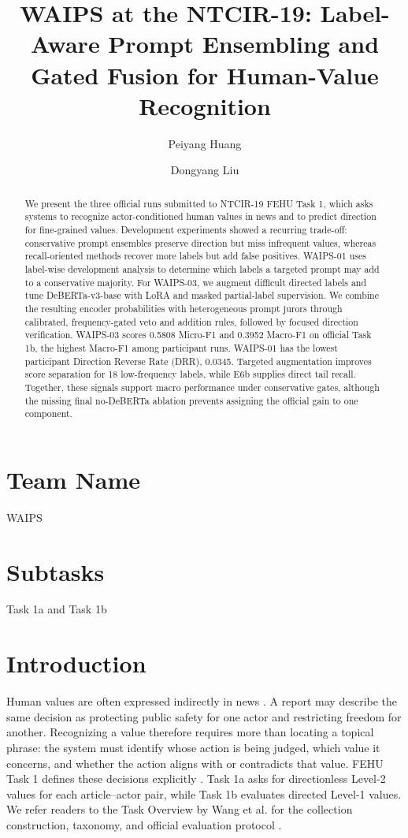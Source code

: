 \documentclass[sigconf,article,a4paper]{acmart}
\title{WAIPS at the NTCIR-19: Label-Aware Prompt Ensembling and Gated Fusion for Human-Value Recognition}
\author{Peiyang Huang}
\affiliation{%
  \institution{Waseda University}
  \country{Japan}
}
\author{Dongyang Liu}
\affiliation{%
  \institution{Waseda University}
  \country{Japan}
}
\begin{document}
\begin{abstract}
We present the three official runs submitted to NTCIR-19 FEHU Task 1, which asks
systems to recognize actor-conditioned human values in news and to predict
direction for fine-grained values. Development experiments showed a recurring
trade-off: conservative prompt ensembles preserve direction but miss
infrequent values, whereas recall-oriented methods recover more labels but add
false positives. WAIPS-01 uses label-wise development analysis to determine
which labels a targeted prompt may add to a conservative majority. For
WAIPS-03, we augment difficult directed labels and tune DeBERTa-v3-base with
LoRA and masked partial-label supervision. We combine the resulting encoder
probabilities with heterogeneous prompt jurors through calibrated,
frequency-gated veto and addition rules, followed by focused direction
verification. WAIPS-03
scores 0.5808 Micro-F1 and 0.3952 Macro-F1 on official Task 1b, the highest
Macro-F1 among participant runs. WAIPS-01 has the lowest participant
Direction Reverse Rate (DRR), 0.0345. Targeted augmentation
improves score separation for 18 low-frequency labels, while E6b supplies
direct tail recall. Together, these signals support macro performance under
conservative gates, although the missing final no-DeBERTa ablation prevents
assigning the official gain to one component.
\end{abstract}


\maketitle
\pagestyle{plain}
\raggedbottom

\section*{Team Name}
WAIPS

\section*{Subtasks}
Task 1a and Task 1b

\section{Introduction}

Human values are often expressed indirectly in news \cite{schwartz2012}. A report may describe the
same decision as protecting public safety for one actor and restricting freedom
for another. Recognizing a value therefore requires more than locating a
topical phrase: the system must identify whose action is being judged, which
value it concerns, and whether the action aligns with or contradicts that
value. FEHU Task 1 defines these decisions explicitly \cite{wangFehu2026}. Task 1a asks for
directionless Level-2 values for each article--actor pair, while Task 1b
evaluates directed Level-1 values. We refer readers to the Task Overview by
Wang et al. for the collection construction, taxonomy, and official evaluation
protocol \cite{wangFehu2026,wangNevu2026}.
\end{document}
